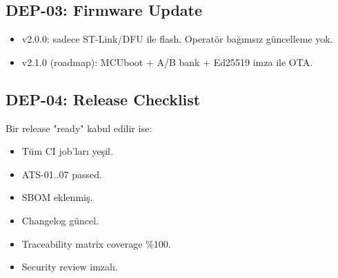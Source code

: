 \subsection{DEP-03: Firmware Update}
\begin{itemize}
    \item v2.0.0: sadece ST-Link/DFU ile flash. Operatör bağımsız güncelleme yok.
    \item v2.1.0 (roadmap): MCUboot + A/B bank + Ed25519 imza ile OTA.
\end{itemize}

\subsection{DEP-04: Release Checklist}
Bir release "ready" kabul edilir ise:
\begin{itemize}
    \item Tüm CI job'ları yeşil.
    \item ATS-01..07 passed.
    \item SBOM eklenmiş.
    \item Changelog güncel.
    \item Traceability matrix coverage \%100.
    \item Security review imzalı.
\end{itemize}
